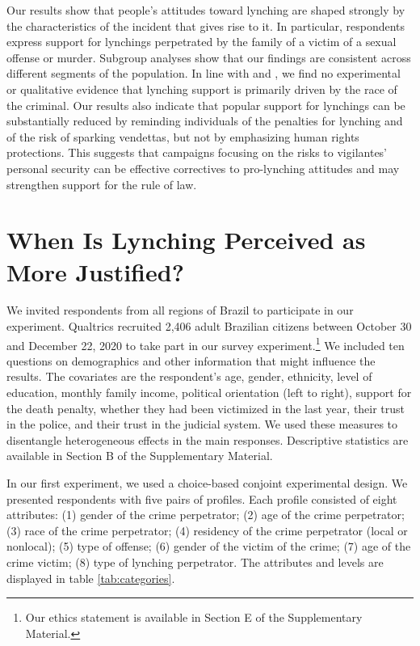 \documentclass[12pt,a4paper]{article}
\begin{document}
Our results show that people's attitudes toward lynching are shaped strongly by
the characteristics of the incident that gives rise to it. In particular,
respondents express support for lynchings perpetrated by the family of a victim
of a sexual offense or murder. Subgroup analyses show that our findings are
consistent across different segments of the population. In line with
\citet{godoy2006popular} and \citet{martins2015linchamentos}, we find no
experimental or qualitative evidence that lynching support is primarily driven
by the race of the criminal. Our results also indicate that popular support for
lynchings can be substantially reduced by reminding individuals of the
penalties for lynching and of the risk of sparking vendettas, but not by
emphasizing human rights protections. This suggests that campaigns focusing on
the risks to vigilantes' personal security can be effective correctives to
pro-lynching attitudes and may strengthen support for the rule of law. 


\section*{When Is Lynching Perceived as More Justified?}
\label{sec:exp01}

We invited respondents from all regions of Brazil to participate in our
experiment. Qualtrics recruited 2,406 adult Brazilian citizens between October
30 and December 22, 2020 to take part in our survey experiment.\footnote{Our
ethics statement is available in Section E of the Supplementary Material.} We
included ten questions on demographics and other information that might
influence the results. The covariates are the respondent's age, gender,
ethnicity, level of education, monthly family income, political orientation
(left to right), support for the death penalty, whether they had been victimized
in the last year, their trust in the police, and their trust in the judicial
system. We used these measures to disentangle heterogeneous effects in the main
responses. Descriptive statistics are available in Section B of the
Supplementary Material.

In our first experiment, we used a choice-based conjoint experimental design.
We presented respondents with five pairs of profiles. Each profile consisted of
eight attributes: (1) gender of the crime perpetrator; (2) age of the crime
perpetrator; (3) race of the crime perpetrator; (4) residency of the crime
perpetrator (local or nonlocal); (5) type of offense; (6) gender of the victim
of the crime; (7) age of the crime victim; (8) type of lynching perpetrator.
The attributes and levels are displayed in table \ref{tab:categories}.
\end{document}

